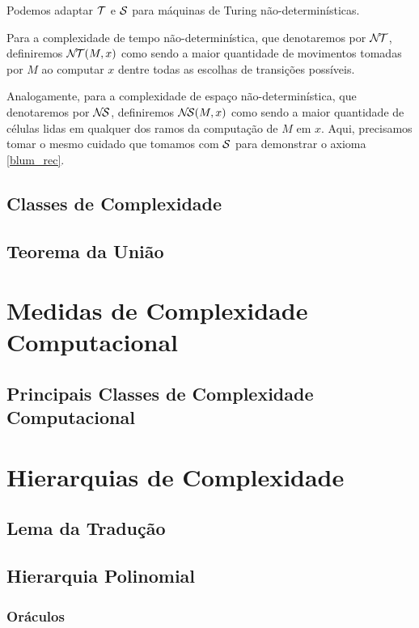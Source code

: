 \begin{example}
    Podemos adaptar ${\mathcal{T}}$ e ${\mathcal{S}}$
    para máquinas de Turing não-determinísticas.

    Para a complexidade de tempo não-determinística,
    que denotaremos por ${\mathcal{N\!T}}$,
    definiremos ${\mathcal{N\!T}}(M, x)$
    como sendo a maior quantidade de movimentos
    tomadas por $M$ ao computar $x$
    dentre todas as escolhas de transições possíveis.

    Analogamente,
    para a complexidade de espaço não-determinística,
    que denotaremos por ${\mathcal{N\!S}}$,
    definiremos ${\mathcal{N\!S}}(M, x)$
    como sendo a maior quantidade de células lidas
    em qualquer dos ramos da computação de $M$ em $x$.
    Aqui, precisamos tomar o mesmo cuidado que tomamos
    com ${\mathcal{S}}$ para demonstrar o axioma \ref{blum_rec}.
\end{example}

\subsection{Classes de Complexidade}

\subsection{Teorema da União}

\section{Medidas de Complexidade Computacional}
\label{medidas_padrao}


\subsection{Principais Classes de Complexidade Computacional}

\section{Hierarquias de Complexidade}

\subsection{Lema da Tradução}

\subsection{Hierarquia Polinomial}

\subsubsection{Oráculos}

